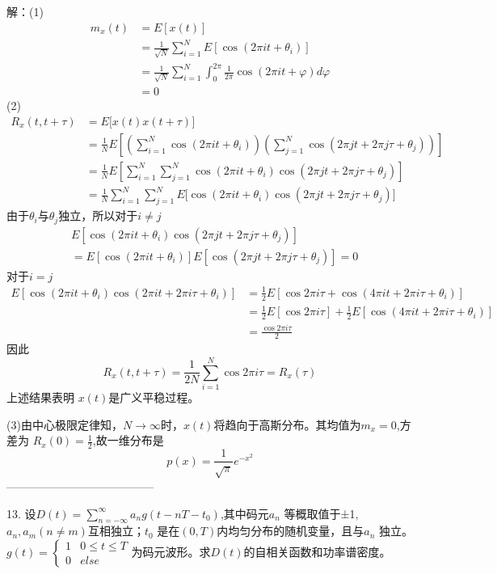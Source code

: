 \documentclass[utf8]{article}
\begin{document}
解：(1)
$$\begin{aligned}m_{x}\left(t\right)&=E\left[x\left(t\right)\right]\\&=\frac1{\sqrt{N}}\sum_{i=1}^NE\left[\cos\left(2\pi it+\theta_i\right)\right]\\&=\frac1{\sqrt{N}}\sum_{i=1}^N\int_0^{2\pi}\frac1{2\pi}\cos\left(2\pi it+\varphi\right)d\varphi\\&=0\end{aligned}$$
(2)
$$\begin{aligned}R_{x}\left(t,t+\tau\right)&=E\Big[x\left(t\right)x\left(t+\tau\right)\Big]\\&=\frac1NE\left[\left(\sum_{i=1}^N\cos\left(2\pi it+\theta_i\right)\right)\left(\sum_{j=1}^N\cos\left(2\pi jt+2\pi j\tau+\theta_j\right)\right)\right]\\&=\frac1NE\left[\sum_{i=1}^N\sum_{j=1}^N\cos\left(2\pi it+\theta_i\right)\cos\left(2\pi jt+2\pi j\tau+\theta_j\right)\right]\\&=\frac1N\sum_{i=1}^N\sum_{j=1}^NE\Big[\cos\left(2\pi it+\theta_i\right)\cos\left(2\pi jt+2\pi j\tau+\theta_j\right)\Big]\end{aligned}$$
由于$\theta_i$与$\theta_j$独立，所以对于$i\neq j$
$$\begin{aligned}&E\left[\cos\left(2\pi it+\theta_i\right)\cos\left(2\pi jt+2\pi j\tau+\theta_j\right)\right]\\&=E\left[\cos\left(2\pi it+\theta_i\right)\right]E\left[\cos\left(2\pi jt+2\pi j\tau+\theta_j\right)\right]=0\end{aligned}$$
对于$i=j$
$$\begin{aligned}E\left[\cos\left(2\pi it+\theta_i\right)\cos\left(2\pi it+2\pi i\tau+\theta_i\right)\right]&=\frac12E\left[\cos2\pi i\tau+\cos\left(4\pi it+2\pi i\tau+\theta_i\right)\right]\\&=\frac12E\left[\cos2\pi i\tau\right]+\frac12E\left[\cos\left(4\pi it+2\pi i\tau+\theta_i\right)\right]\\&=\frac{\cos2\pi i\tau}2\end{aligned}$$
因此
$$R_x\left(t,t+\tau\right)=\frac1{2N}\sum_{i=1}^N\cos2\pi i\tau=R_x\left(\tau\right)$$
上述结果表明 $x(t)$是广义平稳过程。

(3)由中心极限定律知，$N\to\infty$时，$x(t)$将趋向于高斯分布。其均值为$m_x=0$,方差为
$R_x(0)=\frac12$,故一维分布是
$$p(x)=\frac1{\sqrt{\pi}}e^{-x^2}$$
---------------------------------------

13. 设$D(t)=\sum_{n=-\infty}^{\infty}a_ng\left(t-nT-t_0\right)$,其中码元$a_n$ 等概取值于±1,$a_n,a_m(n\neq m)$互相独立；$t_0$ 是在$(0,T)$内均匀分布的随机变量，且与$a_n$ 独立。$g(t)=\begin{cases}1&0\leq t\leq T\\0&else\end{cases}$为码元波形。求$D(t)$的自相关函数和功率谱密度。
\end{document}
